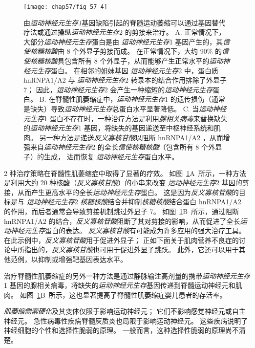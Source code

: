\begin{figure}[htbp]
	\centering
	\texttt{[image: chap57/fig\_57\_4]}
	\caption{由\textit{运动神经元生存1}基因缺陷引起的脊髓运动萎缩可以通过基因替代疗法或通过操纵\textit{运动神经元生存}2 的剪接来治疗。
		A. 正常情况下，大部分\textit{运动神经元生存}蛋白是由 \textit{运动神经元生存}1 基因产生的，其\textit{信使核糖核酸}由 8 个外显子剪接而成。
		在正常情况下，大约 90\% 的\textit{信使核糖核酸}具包含所有 8 个外显子，从而能够产生正常水平的\textit{运动神经元生存}蛋白。
		在相邻的姐妹基因 \textit{运动神经元生存}2 中，蛋白质 hnRNPA1/A2 与 \textit{运动神经元生存}2 转录本的结合作用排除了外显子 7；
		因此，\textit{运动神经元生存}2 会产生一种缩短的\textit{运动神经元生存}蛋白。
		B. 在脊髓性肌萎缩症中，\textit{运动神经元生存}1 的遗传损伤（通常是缺失）导致\textit{运动神经元生存}总蛋白水平显著降低。
		C. 当\textit{运动神经元生存}1 蛋白不存在时，一种治疗方法是利用\textit{腺相关病毒}来替换缺失的\textit{运动神经元生存}1 基因，将缺失的基因递送至中枢神经系统和肌肉。
		另一种方法是递送\textit{反义寡核苷酸}以阻断 hnRNPA1/A2 ，从而增强来自\textit{运动神经元生存}2 的全长\textit{信使核糖核酸}（包含所有 8 个外显子）的生成，
		进而恢复 \textit{运动神经元生存}蛋白水平。}
	\label{fig:57_4}
\end{figure}


2 种治疗策略在脊髓性肌萎缩症中取得了显著的疗效。
如图~\ref{fig:57_4}A~所示，一种方法是利用大约 20 种核酸（\textit{反义寡核苷酸}）的小串来改变 \textit{运动神经元生存}2 基因的剪接，从而产生更高水平的全长\textit{运动神经元生存}蛋白。
这是因为\textit{反义寡核苷酸}的目标是与 \textit{运动神经元生存}2 \textit{核糖核酸}结合并抑制\textit{核糖核酸}结合蛋白 hnRNPA1/A2 的作用，而后者通常会导致剪接机制跳过外显子 7。
如图~\ref{fig:57_4}B~所示，通过阻断 hnRNPA1/A2 的结合，\textit{反义寡核苷酸}阻断了其对剪接的影响，从而促进了全长\textit{运动神经元生存}蛋白的表达。
\textit{反义寡核苷酸}有可能成为许多应用的强大治疗工具。
在此示例中，\textit{反义寡核苷酸}用于促进外显子；
正如下面关于肌肉营养不良症的讨论中所指出的，\textit{反义寡核苷酸}也可用于促进外显子跳跃。
此外，它还可以用于其他范例，以抑制或增强靶基因表达水平。


治疗脊髓性肌萎缩症的另外一种方法是通过静脉输注高剂量的携带\textit{运动神经元生存}1 基因的腺相关病毒，将缺失的\textit{运动神经元生存}基因传递到脊髓运动神经元和肌肉。
如图~\ref{fig:57_4}B~所示，这也显著提高了脊髓性肌萎缩症婴儿患者的存活率。


\textit{肌萎缩侧索硬化}及其变体仅限于影响运动神经元；
它们不影响感觉神经元或自主神经元。
急性病毒性疾病脊髓灰质炎也局限于影响运动神经元。
这些疾病说明了神经细胞的个性和选择性脆弱的原理。
一般而言，这种选择性脆弱的原理尚不清楚。



